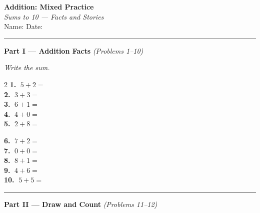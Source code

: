 \documentclass[12pt, letterpaper]{article}
\newcommand{\answerline}{\underline{\hspace{2.5cm}}}
\newcommand{\biganswerline}{\underline{\hspace{4cm}}}
\newcommand{\numbox}{\fbox{\hspace{0.6cm}\vphantom{0}}}
\begin{document}
\begin{center}
  {\LARGE\textbf{\textcolor{scholared}{Addition: Mixed Practice}}}\\[4pt]
  {\Large\textcolor{scholagold}{\textit{Sums to 10 — Facts and Stories}}}\\[6pt]
  {\small Name: \biganswerline \hspace{1cm} Date: \answerline}
\end{center}

\vspace{4pt}
\noindent\textcolor{scholared}{\rule{\linewidth}{1pt}}
\vspace{4pt}


\noindent\textcolor{scholared}{\large\textbf{Part I — Addition Facts}} \hfill \textit{(Problems 1–10)}

\medskip\noindent\textit{Write the sum.}

\bigskip

\begin{multicols}{2}
\noindent\textbf{1.} $\; 5 + 2 = $ \numbox \\[10pt]
\noindent\textbf{2.} $\; 3 + 3 = $ \numbox \\[10pt]
\noindent\textbf{3.} $\; 6 + 1 = $ \numbox \\[10pt]
\noindent\textbf{4.} $\; 4 + 0 = $ \numbox \\[10pt]
\noindent\textbf{5.} $\; 2 + 8 = $ \numbox

\columnbreak

\noindent\textbf{6.} $\; 7 + 2 = $ \numbox \\[10pt]
\noindent\textbf{7.} $\; 0 + 0 = $ \numbox \\[10pt]
\noindent\textbf{8.} $\; 8 + 1 = $ \numbox \\[10pt]
\noindent\textbf{9.} $\; 4 + 6 = $ \numbox \\[10pt]
\noindent\textbf{10.} $\; 5 + 5 = $ \numbox
\end{multicols}

\bigskip
\noindent\textcolor{scholared}{\rule{\linewidth}{0.4pt}}

\noindent\textcolor{scholared}{\large\textbf{Part II — Draw and Count}} \hfill \textit{(Problems 11–12)}
\end{document}
